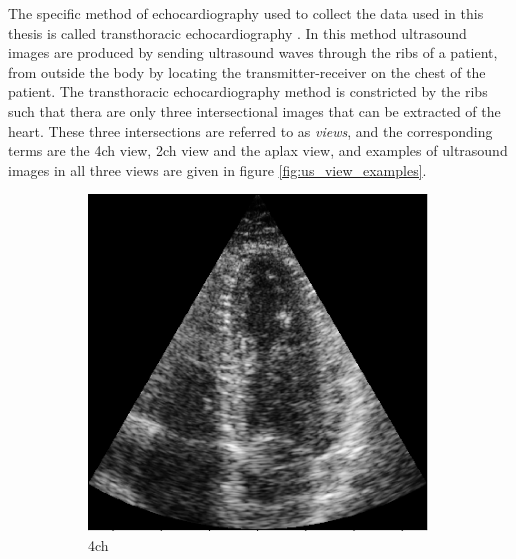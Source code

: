 The specific method of echocardiography used to collect the data used in this thesis is called transthoracic echocardiography \cite{echocardiography_wikipedia}. In this method ultrasound images are produced by sending ultrasound waves through the ribs of a patient, from outside the body by locating the transmitter-receiver on the chest of the patient. The transthoracic echocardiography method is constricted by the ribs such that thera are only three intersectional images that can be extracted of the heart. These three intersections are referred to as \textit{views}, and the corresponding terms are the \acrfull{4ch} view, \acrfull{2ch} view and the \acrfull{aplax} view, and examples of ultrasound images in all three views are given in figure \ref{fig:us_view_examples}.

\begin{figure}[H]
    \centering
    \begin{subfigure}[b]{0.3\textwidth} 
        \includegraphics[width=0.99\textwidth]{echocardiography/4ch_frame.png}
        \caption{\acrshort{4ch}}
        \label{fig:us_view_examples_4ch}
    \end{subfigure}
    \begin{subfigure}[b]{0.3\textwidth}

\end{subfigure}
\end{figure}
